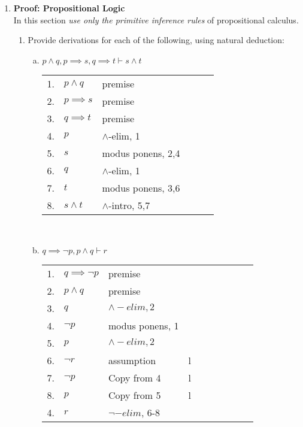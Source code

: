 \documentclass{article}
\begin{document}
\begin{enumerate}[\bf I.]
\item \textbf{Proof: Propositional Logic} \\[6pt]
In this section {\em use only the primitive inference rules} of
propositional calculus.
\begin{enumerate}[1.] \setcounter{enumii}{0}
\item Provide derivations for each of the following, using natural
deduction:
\begin{enumerate}[a.]
 \item $p \land q,p\implies s,q\implies t\vdash s\land t$ \\
   \begin{tabular}{l ll lll}
     1. & $p \land q$ & premise \\
     2. & $p \implies s$ & premise \\
     3. & $q \implies t$ & premise \\
     4. & $p$            & $\land$-elim, 1 \\
     5. & $s$            & modus ponens, 2,4 \\
     6. & $q$            & $\land$-elim, 1 \\
     7. & $t$            & modus ponens, 3,6 \\
     8. & $s\land t$     & $\land$-intro, 5,7 \\
   \end{tabular} \\
 \item $q \implies \neg p,p\land q\vdash r$ \\
   \begin{tabular}{l ll lll llll}
     1. & $q \implies \neg p$ & premise \\
     2. & $p \land q$         & premise \\
     3. & $q$                 & $\land -elim, 2$ \\
     4. & $\neg p$            & modus ponens, 1 \\  
     5. & $p$                 & $\land -elim, 2$ \\
     6.	& $\neg r$            & assumption  & l\\ 
     7. & $\neg p$            & Copy from 4 & l\\
     8. & $p$                 & Copy from 5 & l\\
     4. & $r$                 & $\neg -elim$, 6-8 \\

\end{tabular}
\end{enumerate}
\end{enumerate}
\end{enumerate}
\end{document}
